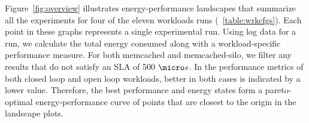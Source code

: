 %

Figure~\ref{fig:overview} illustrates energy-performance landscapes that summarize all the experiments for four of the eleven workloads runs (~\ref{table:wrkcfgs}).  Each point in these graphs represents a single experimental run.  Using log data for a run, we calculate the total energy consumed along with a workload-specific performance measure. For both memcached and memcached-silo, we filter any results that do not satisfy an SLA of 500 $\micro s$. In the performance metrics of both closed loop and open loop workloads, better in both cases is indicated by a lower value. Therefore, the best performance and energy states form a pareto-optimal energy-performance curve of points that are closest to the origin in the landscape plots.  





